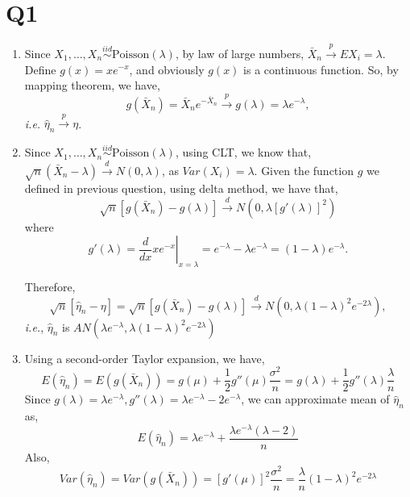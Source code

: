 \documentclass[letterpaper]{article}
\newcommand{\convp}{\stackrel{p}{\to}}
\newcommand{\convd}{\stackrel{d}{\to}}
\newcommand{\IID}{\stackrel{iid}{\sim}}
\begin{document}
\section*{Q1}
\begin{enumerate}
\item Since $X_1, \dots, X_n \IID \text{Poisson}(\lambda)$, by law of large numbers, $\bar X_n \convp EX_i = \lambda$.
Define $g(x) = xe^{-x}$, and obviously $g(x)$ is a continuous function. So, by mapping theorem, we have,
\[
g(\bar X_n) = \bar X_n e^{-\bar X_n} \convp g(\lambda) = \lambda e^{-\lambda},
\]
\emph{i.e.} $\hat \eta_n \convp \eta$.
\item Since $X_1, \dots, X_n \IID \text{Poisson}(\lambda)$, using CLT, we know that, $\sqrt{n}(\bar X_n - \lambda) \convd N(0, \lambda)$, as $Var(X_i) = \lambda$. 
Given the function $g$ we defined in previous question, using delta method, we have that,
\[
\sqrt{n}\left[ g(\bar X_n) - g(\lambda) \right] \convd N(0, \lambda [g'(\lambda)]^2)
\]
where 
\[
g'(\lambda) = \left. \frac{d}{dx} xe^{-x} \right|_{x =\lambda} = e^{-\lambda} - \lambda e^{-\lambda} = (1-\lambda) e^{-\lambda}.
\]

Therefore, 
\[
\sqrt{n}[\hat \eta_n - \eta] = \sqrt{n}\left[ g(\bar X_n) - g(\lambda) \right] \convd N(0, \lambda (1-\lambda)^2 e^{-2\lambda}),
\]
\emph{i.e.}, $\hat \eta_n$ is $AN(\lambda e^{-\lambda}, \lambda (1-\lambda)^2 e^{-2\lambda})$
\item
Using a second-order Taylor expansion, we have,
\[
E(\hat \eta_n) = E(g(\bar X_n)) = g(\mu) + \frac{1}{2} g''(\mu) \frac{\sigma^2}{n} = g(\lambda) + \frac{1}{2} g''(\lambda) \frac{\lambda}{n}
\]
Since $g(\lambda) = \lambda e^{-\lambda}, g''(\lambda) = \lambda e^{-\lambda} - 2e^{-\lambda}$, we can approximate mean of $\hat \eta_n$ as,
\[
E(\hat \eta_n) = \lambda e^{-\lambda} + \frac{\lambda e^{-\lambda}(\lambda -2)}{n}
\]
Also,
\[
Var(\hat \eta_n) = Var(g(\bar X_n)) = [g'(\mu)]^2 \frac{\sigma^2}{n} = \frac{\lambda}{n} (1-\lambda)^2 e^{-2\lambda}
\]
\end{enumerate}
\end{document}
